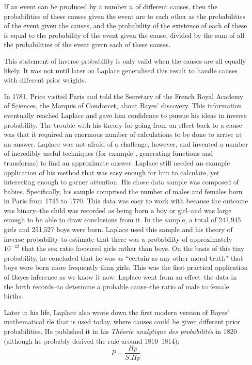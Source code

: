 \documentclass[a4paper,11pt]{apa7}
\begin{document}
If an event can be produced by a number $n$ of different causes, then the probabilities of these causes given the event are to each other as the probabilities of the event given the causes, and the probability of the existence of each of these is equal to the probability of the event given the cause, divided by the sum of all the probabilities of the event given each of these causes.

This statement of inverse probability is only valid when the causes are all equally likely. It was not until later on Laplace generalised this result to handle causes with different prior weights.

In 1781, Price visited Paris and told the Secretary of the French Royal Academy of Sciences, the Marquis of Condorcet, about Bayes' discovery. This information eventually reached Laplace and gave him confidence to pursue his ideas in inverse probability. The trouble with his theory for going from an effect back to a cause was that it required an enormous number of calculations to be done to arrive at an answer. Laplace was not afraid of a challenge, however, and invented a number of incredibly useful techniques (for example , generating functions and transforms) to find an approximate answer. Laplace still needed an example application of his method that was easy enough for him to calculate, yet interesting enough to garner attention. His chose data sample was composed of babies. Specifically, his sample comprised the number of males and females born in Paris from 1745 to 1770. This data was easy to work with because the outcome was binary--the child was recorded as being born a boy or girl--and was large enough to be able to draw conclusions from it. In the sample, a total of 241,945 girls and 251,527 boys were born. Laplace used this sample and his theory of inverse probability to estimate that there was a probability of approximately $10^{-42}$ that the sex ratio favoured girls rather than boys. On the basis of this tiny probability, he concluded that he was as ``certain as any other moral truth'' that boys were born more frequently than girls. This was the first practical application of Bayes inference as we know it now. Laplace went from an effect--the data in the birth records--to determine a probable cause--the ratio of male to female births.

Later in his life, Laplace also wrote down the first modern version of Bayes' mathematical rle that is used today, where causes could be given different prior probabilities. He published it in his \textit{Th{\'e}orie analytique des probabilit{\'e}s} in 1820 (although he probably derived the rule around 1810--1814):
\[ P=\frac{Hp}{S. Hp} \]
\end{document}

